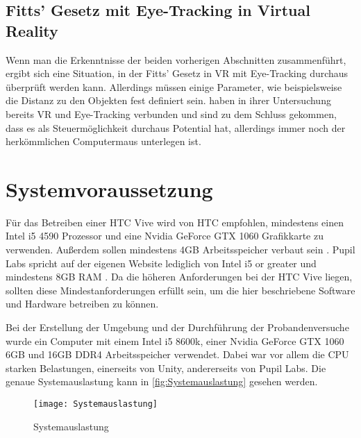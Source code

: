 \subsection{Fitts' Gesetz mit Eye-Tracking in Virtual Reality}
Wenn man die Erkenntnisse der beiden vorherigen Abschnitten zusammenführt, ergibt sich eine Situation, in der Fitts' Gesetz in VR mit Eye-Tracking durchaus überprüft werden kann. Allerdings müssen einige Parameter, wie beispielsweise die Distanz zu den Objekten fest definiert sein. \citeauthor{Hansen.2018} haben in ihrer Untersuchung bereits VR und Eye-Tracking verbunden und sind zu dem Schluss gekommen, dass es als Steuermöglichkeit durchaus Potential hat, allerdings immer noch der herkömmlichen Computermaus unterlegen ist. \cite{Hansen.2018}

\section{Systemvoraussetzung}
Für das Betreiben einer HTC Vive wird von HTC empfohlen, mindestens einen Intel i5 4590 Prozessor und eine Nvidia GeForce GTX 1060 Grafikkarte zu verwenden. Außerdem sollen mindestens 4GB Arbeitsspeicher verbaut sein \cite{sys.requirements.2020}. Pupil Labs spricht auf der eigenen Website lediglich von \glqq Intel i5 or greater\grqq{} und mindestens 8GB RAM \cite{Pupil.Labs.reqs}. Da die höheren Anforderungen bei der HTC Vive liegen, sollten diese Mindestanforderungen erfüllt sein, um die hier beschriebene Software und Hardware betreiben zu können. 

Bei der Erstellung der Umgebung und der Durchführung der Probandenversuche wurde ein Computer mit einem Intel i5 8600k, einer Nvidia GeForce GTX 1060 6GB und 16GB DDR4 Arbeitsspeicher verwendet. Dabei war vor allem die CPU starken Belastungen, einerseits von Unity, andererseits von Pupil Labs. Die genaue Systemauslastung kann in \autoref{fig:Systemauslastung} gesehen werden.

\begin{figure}[!htbp]
	\centering
	\texttt{[image: Systemauslastung]}
	\caption[Systemauslastung]{Systemauslastung}
	\label{fig:Systemauslastung}
\end{figure}